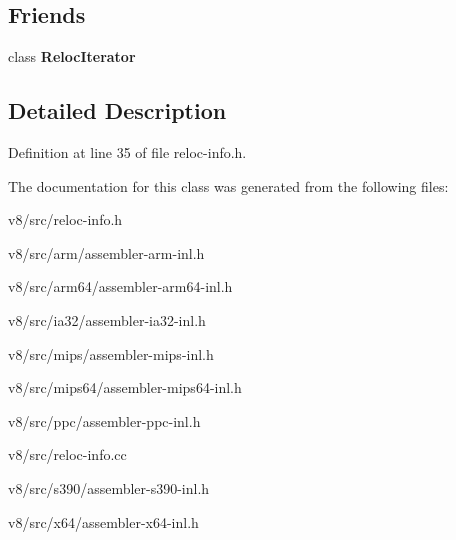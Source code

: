 \subsection*{Friends}
\begin{DoxyCompactItemize}
\item 
\mbox{\label{classv8_1_1internal_1_1RelocInfo_a9ff673d9f08f4ce3738760e4e66dc88a}} 
class {\bfseries Reloc\+Iterator}
\end{DoxyCompactItemize}


\subsection{Detailed Description}


Definition at line 35 of file reloc-\/info.\+h.



The documentation for this class was generated from the following files\+:\begin{DoxyCompactItemize}
\item 
v8/src/reloc-\/info.\+h\item 
v8/src/arm/assembler-\/arm-\/inl.\+h\item 
v8/src/arm64/assembler-\/arm64-\/inl.\+h\item 
v8/src/ia32/assembler-\/ia32-\/inl.\+h\item 
v8/src/mips/assembler-\/mips-\/inl.\+h\item 
v8/src/mips64/assembler-\/mips64-\/inl.\+h\item 
v8/src/ppc/assembler-\/ppc-\/inl.\+h\item 
v8/src/reloc-\/info.\+cc\item 
v8/src/s390/assembler-\/s390-\/inl.\+h\item 
v8/src/x64/assembler-\/x64-\/inl.\+h\end{DoxyCompactItemize}
